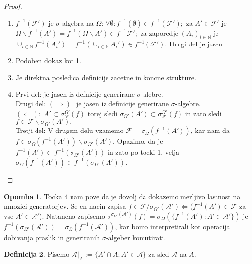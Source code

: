\documentclass[a4paper,12pt]{article}
\theoremstyle{definition} %
\newtheorem{definicija}{Definicija}[section]
\newtheorem{opomba}[definicija]{Opomba}
\theoremstyle{plain} %
\newcommand{\N}{\mathbb{N}}
\newcommand{\F}{\mathcal{F}}
\newcommand{\A}{\mathcal{A}}
\begin{document}
            \begin{proof}
                \begin{enumerate}
                    \item $f^{-1}(\F')$ je $\sigma$-algebra na $\Omega$: $\forall \emptyset : f^{-1}(\emptyset) \in f^{-1}(\F');$ za $A'\in \F'$ je $\Omega \backslash f^{-1}(A') = f^{-1}(\Omega \backslash A') \in f^{-1}{\F'};$ za zaporedje $(A_i)_{i \in \N}$ je $\cup_{i \in \N}f^{-1}(A_i') = f^{-1}(\cup_{i \in \N}A_i') \in f^{-1}(\F').$ Drugi del je jasen
                    \item Podoben dokaz kot 1.
                    \item Je direktna posledica definicije zacetne in koncne strukture.
                    \item Prvi del: je jasen iz defnicije generirane $\sigma$-alebre. \\
                    Drugi del: $(\Rightarrow):$ je jasen iz definicije generirane $\sigma$-algebre. \\
                    $(\Leftarrow):$ $A' \subset \sigma_{\F}^{\Omega '}(f)$ torej sledi $\sigma_{\Omega'}(A')\subset \sigma_{\F}^{\Omega '}(f)$ in zato sledi $f \in \F\backslash\sigma_{\Omega'}(A'). $ \\
                    Tretji del: V drugem delu vzamemo $\F = \sigma_{\Omega}(f^{-1}(A'))$, kar nam da $f \in \sigma_{\Omega}(f^{-1}(A'))\backslash\sigma_{\Omega'}(A')$. Opazimo, da je $f^{-1}(A')\subset f^{-1}(\sigma_{\Omega'}(A'))$ in zato po tocki 1. velja $\sigma_{\Omega}(f^{-1}(A')) \subset f^{-1}(\sigma_{\Omega'}(A'))$.
                \end{enumerate}
            \end{proof}

            \begin{opomba}
                Tocka 4 nam pove da je dovolj da dokazemo  merljivo lastnost na mnozici generatorjev. Se en nacin zapisa $f \in \F/\sigma_{\Omega'}(\A') \iff (f^{-1}(A') \in \F$ za vse $A' \in \A'$). Natancno zapisemo $\sigma^{\sigma_{\Omega'}(\A')}(f) = \sigma_\Omega(\{f^{-1}(A'):A' \in \A'\})$ je $f^{-1}(\sigma_{\Omega'}(\A')) = \sigma_\Omega(f^{-1}(\A'))$, kar bomo interpretirali kot operacija dobivanja praslik in generiranih $\sigma$-algeber komutirati.
            \end{opomba}

            \begin{definicija}
                Pisemo $\A|_A := \{A'\cap A : A'\in \A\}$ za sled $\A$ na $A$.
            \end{definicija}
\end{document}
